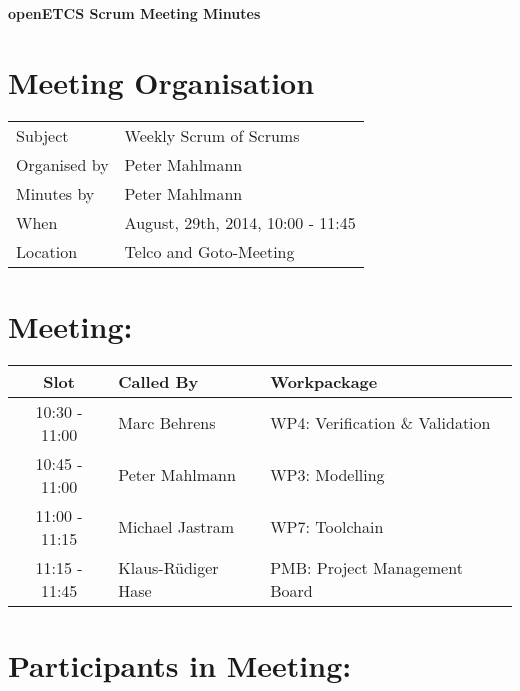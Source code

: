 \documentclass[a4paper, 11pt]{article}
\begin{document}
{\begin{center}\huge\bf openETCS Scrum Meeting Minutes\end{center}}
\section{Meeting Organisation}

\renewcommand{\arraystretch}{1.5}
\begin{supertabular}{m{.2\textwidth}m{.8\textwidth}}
Subject & Weekly Scrum of Scrums\\
Organised by & Peter Mahlmann\\
Minutes by & Peter Mahlmann\\
When & August, 29th, 2014, 10:00 - 11:45\\
Location & Telco and Goto-Meeting\\
\end{supertabular}

\renewcommand{\arraystretch}{1.0}
\section{Meeting:}

\begin{tabular}{|c|l|l|}
\hline
\textbf{Slot} &  \textbf{Called By} & \textbf{Workpackage} \\
\hline  
10:30 - 11:00 & Marc Behrens & WP4: Verification \& Validation \\\hline  
10:45 - 11:00 & Peter Mahlmann & WP3: Modelling \\\hline  
11:00 - 11:15 & Michael Jastram & WP7: Toolchain \\\hline
11:15 - 11:45 & Klaus-R\"udiger Hase & PMB: Project Management Board \\\hline  
\end{tabular}

\section{Participants in Meeting:}
\end{document}

